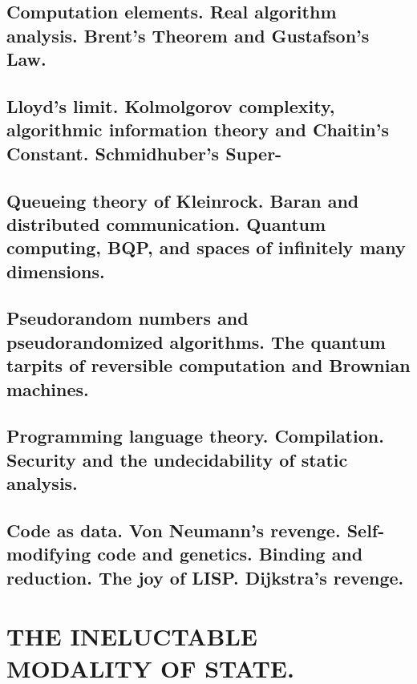 \documentclass[letterpaper,draft]{memoir}
\begin{document}
\chapter{Computation elements. Real algorithm analysis. Brent's Theorem and
Gustafson's Law.}

\chapter{Lloyd's limit. Kolmolgorov complexity, algorithmic information theory and
Chaitin's Constant. Schmidhuber's Super- }

\chapter{Queueing theory of Kleinrock. Baran and distributed communication. Quantum
computing, BQP, and spaces of infinitely many dimensions.}

\chapter{Pseudorandom numbers and pseudorandomized algorithms. The quantum tarpits of
reversible computation and Brownian machines.}

\chapter{Programming language theory. Compilation. Security and the undecidability of
static analysis.}

\chapter{Code as data. Von Neumann's revenge. Self-modifying code and genetics.
Binding and reduction. The joy of LISP\@. Dijkstra's revenge.}

\part{THE INELUCTABLE MODALITY OF STATE\@.}

\end{document}
